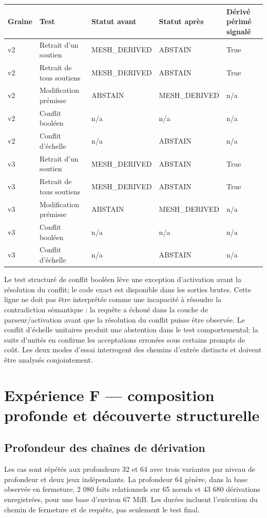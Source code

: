 \documentclass[11pt,a4paper]{article}
\begin{document}
\scriptsize\setlength{\tabcolsep}{1.5pt}
\begin{longtable}{p{}p{}p{}p{}p{}}
\toprule Graine & Test & Statut avant & Statut après & Dérivé périmé signalé \\
\midrule

v2 & Retrait d’un soutien & MESH\_DERIVED & ABSTAIN & True \\
v2 & Retrait de tous soutiens & MESH\_DERIVED & ABSTAIN & True \\
v2 & Modification prémisse & ABSTAIN & MESH\_DERIVED & n/a \\
v2 & Conflit booléen & n/a & n/a & n/a \\
v2 & Conflit d’échelle & n/a & ABSTAIN & n/a \\
v3 & Retrait d’un soutien & MESH\_DERIVED & ABSTAIN & True \\
v3 & Retrait de tous soutiens & MESH\_DERIVED & ABSTAIN & True \\
v3 & Modification prémisse & ABSTAIN & MESH\_DERIVED & n/a \\
v3 & Conflit booléen & n/a & n/a & n/a \\
v3 & Conflit d’échelle & n/a & ABSTAIN & n/a \\
\bottomrule
\end{longtable}
\normalsize\setlength{\tabcolsep}{6pt}

Le test structuré de conflit booléen lève une exception d’activation avant la résolution du conflit; le code exact est disponible dans les sorties brutes. Cette ligne ne doit pas être interprétée comme une incapacité à résoudre la contradiction sémantique : la requête a échoué dans la couche de parseur/activation avant que la résolution du conflit puisse être observée. Le conflit d’échelle unitaires produit une abstention dans le test comportemental; la suite d’unités en confirme les acceptations erronées sous certains prompts de coût. Les deux modes d’essai interrogent des chemins d’entrée distincts et doivent être analysés conjointement.

\section{Expérience F — composition profonde et découverte structurelle}
\subsection{Profondeur des chaînes de dérivation}
Les cas sont répétés aux profondeurs 32 et 64 avec trois variantes par niveau de profondeur et deux jeux indépendants. La profondeur 64 génère, dans la base observée en fermeture, 2 080 faits relationnels sur 65 nœuds et 43 680 dérivations enregistrées, pour une base d’environ 67 MiB. Les durées incluent l’exécution du chemin de fermeture et de requête, pas seulement le test final.
\end{document}

